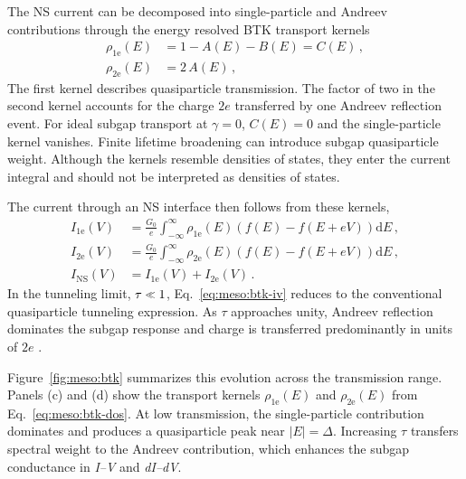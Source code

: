             The NS current can be decomposed into single-particle and Andreev contributions through the energy resolved BTK transport kernels
            \begin{equation}
                \begin{aligned}
                    \rho_\mathrm{1e}(E) &= 1 - A(E) - B(E) = C(E)\,,\\
                    \rho_\mathrm{2e}(E) &= 2 \, A(E) \,,
                \end{aligned}
                \label{eq:meso:btk-dos}
            \end{equation}
            The first kernel describes quasiparticle transmission. The factor of two in the second kernel accounts for the charge $2e$ transferred by one Andreev reflection event. For ideal subgap transport at $\gamma=0$, $C(E)=0$ and the single-particle kernel vanishes. Finite lifetime broadening can introduce subgap quasiparticle weight. Although the kernels resemble densities of states, they enter the current integral and should not be interpreted as densities of states.

            The current through an NS interface then follows from these kernels,
            \begin{equation}
                \begin{aligned}
                    I_\mathrm{1e}(V) &= \frac{G_0}{e} \int_{-\infty}^{\infty} \rho_\mathrm{1e}(E) \left(f(E) - f(E + eV)\right) \mathrm{d}E\,,\\
                    I_\mathrm{2e}(V) &= \frac{G_0}{e} \int_{-\infty}^{\infty} \rho_\mathrm{2e}(E) \left(f(E) - f(E + eV)\right) \mathrm{d}E\,,\\
                    I_\mathrm{NS}(V) &= I_\mathrm{1e}(V) + I_\mathrm{2e}(V)\,.
                \end{aligned}
                \label{eq:meso:btk-iv}
            \end{equation}
            In the tunneling limit, $\tau\sll1$, Eq.~\eqref{eq:meso:btk-iv} reduces to the conventional quasiparticle tunneling expression. As $\tau$ approaches unity, Andreev reflection dominates the subgap response and charge is transferred predominantly in units of $2e$ \cite{blonder_transition_1982}.

            Figure~\ref{fig:meso:btk} summarizes this evolution across the transmission range. Panels (c) and (d) show the transport kernels $\rho_{\mathrm{1e}}(E)$ and $\rho_{\mathrm{2e}}(E)$ from Eq.~\eqref{eq:meso:btk-dos}. At low transmission, the single-particle contribution dominates and produces a quasiparticle peak near $|E|=\Delta$. Increasing $\tau$ transfers spectral weight to the Andreev contribution, which enhances the subgap conductance in \textit{I--V} and \textit{dI--dV}.

